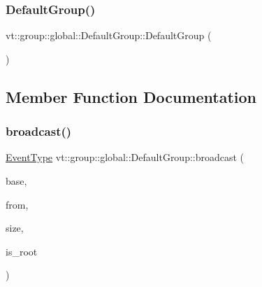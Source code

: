 \subsubsection{\texorpdfstring{Default\+Group()}{DefaultGroup()}}
{\footnotesize\ttfamily vt\+::group\+::global\+::\+Default\+Group\+::\+Default\+Group (\begin{DoxyParamCaption}{ }\end{DoxyParamCaption})\hspace{0.3cm}{\ttfamily [default]}}



\subsection{Member Function Documentation}
\mbox{\label{structvt_1_1group_1_1global_1_1_default_group_a473b19ec41ee9fe654645405a313cca4}} 
\subsubsection{\texorpdfstring{broadcast()}{broadcast()}}
{\footnotesize\ttfamily \hyperlink{namespacevt_a009267401def7ae8bf201892222d060f}{Event\+Type} vt\+::group\+::global\+::\+Default\+Group\+::broadcast (\begin{DoxyParamCaption}\item[{\hyperlink{namespacevt_ab2b3d506ec8e8d1540aede826d84a239}{Msg\+Shared\+Ptr}$<$ \hyperlink{namespacevt_a44d0d4e144748f2b19a1cfd962f50338}{Base\+Msg\+Type} $>$ const \&}]{base,  }\item[{\hyperlink{namespacevt_a866da9d0efc19c0a1ce79e9e492f47e2}{Node\+Type} const \&}]{from,  }\item[{\hyperlink{namespacevt_a408e86a8c7c89309b52907dc5a513924}{Msg\+Size\+Type} const \&}]{size,  }\item[{bool const}]{is\+\_\+root }\end{DoxyParamCaption})\hspace{0.3cm}{\ttfamily [static]}}

\mbox{\label{structvt_1_1group_1_1global_1_1_default_group_a2f503c7d6615e558ce08b0de7a1e8bfa}} 
